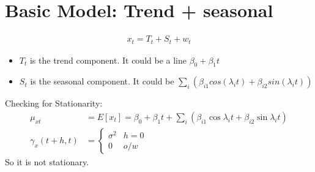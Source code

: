 \section{Basic Model: Trend + seasonal}
\begin{align*}
    x_t = T_t + S_t + w_t
\end{align*}
\begin{itemize}
    \item $T_t$ is the trend component. It could be a line $\beta_0 + \beta_1 t$
    \item $S_t$ is the seasonal component. It could be $\sum_i(\beta_{i1}cos(\lambda_it) + \beta_{i2}sin(\lambda_it)) $
\end{itemize}
Checking for Stationarity: 
    \begin{align*}
        \mu_{xt} &= E[x_t] = \beta_0 + \beta_1 t + \sum_i(\beta_{i1}\cos{\lambda_it} + \beta_{i2}\sin{\lambda_it}) \\
        \gamma_x(t+h, t) &= 
            \begin{cases}
                \sigma^2 & h=0 \\
                0 & o/w
            \end{cases} 
    \end{align*}
So it is not stationary. 

